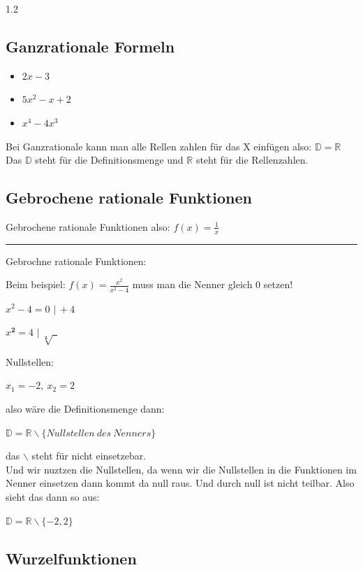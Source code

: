\documentclass{article}
\newcommand{\Zeilenabstand}{1.2}
\newcommand{\absatz}{5mm}
\newcommand{\strich}{\vspace{\absatz}\hrule\vspace{\absatz}}
\begin{document}
\begin{spacing}{\Zeilenabstand}
    \subsection{Ganzrationale Formeln}

    \begin{itemize}
        \item[$\Rightarrow$] $2x-3$
        \item[$\Rightarrow$] $5x^2-x+2$
        \item[$\Rightarrow$] $x^4-4x^3$
    \end{itemize}

    Bei Ganzrationale kann man alle Rellen zahlen für das X einfügen also:
    $\mathbb{D} = \mathbb{R}$ 
    Das $\mathbb{D}$ steht für die Definitionsmenge und $\mathbb{R}$ steht für die Rellenzahlen.


    \subsection{Gebrochene rationale Funktionen}

    Gebrochene rationale Funktionen also: $f(x)=\frac{1}{x}$

    \strich

    Gebrochne rationale Funktionen:

    Beim beispiel: $f(x)=\frac{x^2}{x^2-4}$ muss man die Nenner gleich 0 setzen!

    $x^2 -4 =0$ $\vert \ +4$

    $x^\mathbf{2} = 4$ $\vert \ \sqrt[\mathbf{2}]{\ \ }$

    Nullstellen:

    $x_1 = -2, \  x_2 = 2$

    also wäre die Definitionsmenge dann:

    $\mathbb{D} = \mathbb{R} \backslash \{ Nullstellen \ des \ Nenners\}$


    das $\backslash$ steht für nicht einsetzebar.\\
    Und wir nuztzen die Nullstellen, da wenn wir die Nullstellen in die Funktionen im Nenner einsetzen dann kommt da null raus. Und durch null ist nicht teilbar. Also sieht das dann so aus:


    $\mathbb{D} = \mathbb{R} \backslash \{-2,2\}$

    \subsection{Wurzelfunktionen}


\end{spacing}
\end{document}
